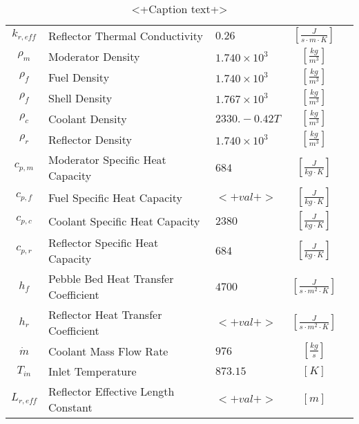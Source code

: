 \begin{table}[ht!]
\begin{tabularx}{\textwidth}{|c|l|X|c|r|}
$k_{r,eff}$ & Reflector Thermal Conductivity & $0.26$ & $[\frac{J}{s\cdot m\cdot K}]$ & \cite{andreades_technical_2014} \\
$\rho_m$ & Moderator Density & $1.740\times10^3$ & $[\frac{kg}{m^3}]$ & \cite{andreades_technical_2014} \\
$\rho_f$ & Fuel Density & $1.740\times10^3$ & $[\frac{kg}{m^3}]$ & \cite{andreades_technical_2014} \\
$\rho_f$ & Shell Density & $1.767\times10^3$ & $[\frac{kg}{m^3}]$ & \cite{andreades_technical_2014} \\
$\rho_c$ & Coolant Density & $2330.-0.42T$& $[\frac{kg}{m^3}]$ & \cite{gierszewski_property_1980}\\
$\rho_r$ & Reflector Density & $1.740\times10^3$ & $[\frac{kg}{m^3}]$ & \cite{andreades_technical_2014} \\
$c_{p,m}$ & Moderator Specific Heat Capacity & $684$ & $[\frac{J}{kg\cdot K}]$ & \cite{snead_thermal_1995} \\
$c_{p,f}$ & Fuel Specific Heat Capacity & $<+val+>$ & $[\frac{J}{kg\cdot K}]$ & \cite{<+ref+>} \\
$c_{p,c}$ & Coolant Specific Heat Capacity & $2380$ & $[\frac{J}{kg\cdot K}]$ & \cite{gierszewski_property_1980}\\
$c_{p,r}$ & Reflector Specific Heat Capacity & $684$ & $[\frac{J}{kg\cdot K}]$ & \cite{snead_thermal_1995} \\
$h_f$ & Pebble Bed Heat Transfer Coefficient & $4700$ & $[\frac{J}{s \cdot m^2\cdot K}]$ & \cite{andreades_technical_2014} \\
$h_r$ & Reflector Heat Transfer Coefficient & $<+val+>$ & $[\frac{J}{s \cdot m^2\cdot K}]$ & \cite{<+ref+>} \\
$\dot{m}$ & Coolant Mass Flow Rate & $976$ & $[\frac{kg}{s}]$ & \cite{andreades_technical_2014} \\
$T_{in}$ & Inlet Temperature & $873.15$ & $[K]$ & \cite{andreades_technical_2014} \\
$L_{r,eff}$ & Reflector Effective Length Constant & $<+val+>$ & $[m]$ & \cite{<+ref+>} \\
\hline
\end{tabularx}
\caption{<+Caption text+>}
\label{tab:th_data_needs}
\end{table}


% 
